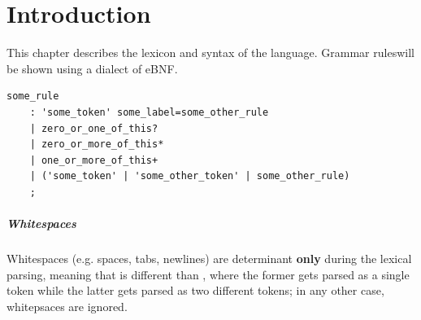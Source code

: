 \chapter{Introduction}

This chapter describes the lexicon and syntax of the language.
Grammar rules\footnotemark[1] will be shown using a dialect of eBNF.


\begin{listing}
	\label{lst:ebnf_dialect}
	\caption{Example of a definition of  using the eBNF dialect}
	\begin{verbatim}
some_rule
	: 'some_token' some_label=some_other_rule
	| zero_or_one_of_this?
	| zero_or_more_of_this*
	| one_or_more_of_this+
	| ('some_token' | 'some_other_token' | some_other_rule)
	;
	\end{verbatim}
\end{listing}

\paragraph{Whitespaces} Whitespaces (e.g. spaces, tabs, newlines) are
determinant \textbf{only} during the lexical parsing, meaning that \code{!=} is
different than \code{! =}, where the former gets parsed as a single token while
the latter gets parsed as two different tokens; in any other case, whitepsaces
are ignored.

